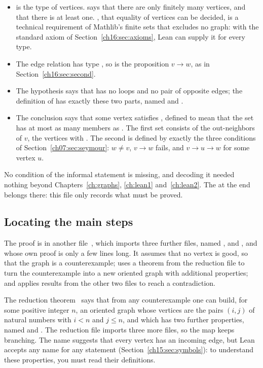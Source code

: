 \begin{itemize}
\item {} is the type of vertices. \code{[Fintype V]} says that there are only finitely many vertices, and \code{[Nonempty V]} that there is at least one. \code{[DecidableEq V]}, that equality of vertices can be decided, is a technical requirement of Mathlib's finite sets that excludes no graph: with the standard axiom  of Section~\ref{ch16:sec:axioms}, Lean can supply it for every type.
\item The edge relation  has type , so  is the proposition $v\to w$, as in Section~\ref{ch16:sec:second}.
\item The hypothesis  says that  has no loops and no pair of opposite edges; the definition of  has exactly these two parts, named  and .
\item The conclusion says that some vertex  satisfies , defined to mean that the set  has at most as many members as . The first set consists of the out-neighbors of $v$, the vertices  with . The second is defined by exactly the three conditions of Section~\ref{ch07:sec:seymour}: $w\ne v$, $v\to w$ fails, and $v\to u\to w$ for some vertex $u$.
\end{itemize}
No condition of the informal statement is missing, and decoding it needed nothing beyond Chapters~\ref{ch:graphs}, \ref{ch:lean1} and~\ref{ch:lean2}. The  at the end belongs there: this file only records what must be proved.

\subsection*{Locating the main steps}
The proof is in another file~\cite{oaimain}, which imports three further files, named ,  and , and whose own proof is only a few lines long. It assumes that no vertex is good, so that the graph is a counterexample; uses a theorem from the reduction file to turn the counterexample into a new oriented graph with additional properties; and applies results from the other two files to reach a contradiction.

The reduction theorem~\cite{oaireduction} says that from any counterexample one can build, for some positive integer $n$, an oriented graph whose vertices are the pairs $(i,j)$ of natural numbers with $i<n$ and $j\le n$, and which has two further properties, named  and . The reduction file imports three more files, so the map keeps branching. The name  suggests that every vertex has an incoming edge, but Lean accepts any name for any statement (Section~\ref{ch15:sec:symbols}): to understand these properties, you must read their definitions.

